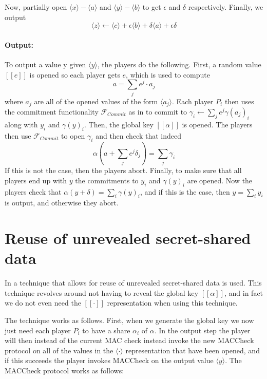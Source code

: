 \documentclass[../main.tex]{subfiles}
\begin{document}
Now, partially open $\langle x \rangle - \langle a \rangle$ and $\langle y \rangle - \langle b \rangle$ to get $\epsilon$ and $\delta$ respectively. Finally, we output $$\langle z \rangle \leftarrow \langle c \rangle + \epsilon \langle b \rangle + \delta \langle a \rangle + \epsilon \delta$$

\paragraph{Output:}
To output a value y given $\langle y \rangle$, the players do the following.
First, a random value $[\![ e ]\!]$ is opened so each player gets $e$, which is used to compute $$a = \sum_j e^j \cdot a_j$$ where $a_j$ are all of the opened values of the form $\langle a_j \rangle$.
Each player $P_i$ then uses the commitment functionality $\mathcal{F}_{Commit}$ as in \cite{damgaard2012multiparty} to commit to $\gamma_i \leftarrow \sum_j e^j \gamma(a_j)_i$ along with $y_i$ and $\gamma(y)_i$.
Then, the global key $[\![ \alpha ]\!]$ is opened.
The players then use $\mathcal{F}_{Commit}$ to open $\gamma_i$ and then check that indeed $$\alpha(a + \sum_j e^j \delta_j) = \sum_j \gamma_i$$
If this is not the case, then the players abort.
Finally, to make sure that all players end up with $y$ the commitments to $y_i$ and $\gamma(y)_i$ are opened. Now the players check that $\alpha(y + \delta) = \sum_i \gamma(y)_i$, and if this is the case, then $y = \sum_i y_i$ is output, and otherwise they abort.

\section{Reuse of unrevealed secret-shared data} \label{section: Reuse}

In \cite{damgaard2013practical} a technique that allows for reuse of unrevealed secret-shared data is used.
This technique revolves around not having to reveal the global key $[\![ \alpha ]\!]$, and in fact we do not even need the $[\![ \cdot ]\!]$ representation when using this technique.

The technique works as follows.
First, when we generate the global key we now just need each player $P_i$ to have a share $\alpha_i$ of $\alpha$. In the output step the player will then instead of the current MAC check instead invoke the new MACCheck protocol on all of the values in the $\langle \cdot \rangle$ representation that have been opened, and if this succeeds the player invokes MACCheck on the output value $\langle y \rangle$. The MACCheck protocol works as follows:
\end{document}
